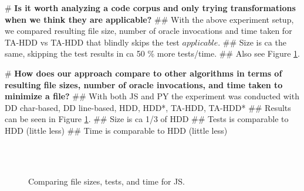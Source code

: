 \documentclass[numbers]{sigplanconf}
\begin{document}
\begin{easylist}[itemize]
# \textbf{Is it worth analyzing a code corpus and only trying transformations when we think they are applicable?}
## With the above experiment setup, we compared resulting file size, number of oracle invocations and time taken for TA-HDD vs TA-HDD that blindly skips the test $applicable$.
## Size is ca the same, skipping the test results in ca 50 \% more tests/time.
## Also see Figure \ref{fig_comparison}.
\end{easylist}

\begin{easylist}[itemize]
# \textbf{How does our approach compare to other algorithms in terms of resulting file sizes, number of oracle invocations, and time taken to minimize a file?}
## With both JS and PY the experiment was conducted with DD char-based, DD line-based, HDD, HDD*, TA-HDD, TA-HDD*
## Results can be seen in Figure \ref{fig_comparison}.
## Size is ca 1/3 of HDD
## Tests is comparable to HDD (little less)
## Time is comparable to HDD (little less)
\end{easylist}

\begin{figure}
\begin{center}
\\
\\
\end{center}
\caption{Comparing file sizes, tests, and time for JS.}
\label{fig_comparison}
\end{figure}
\end{document}
